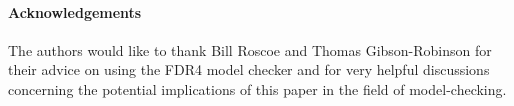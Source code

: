 
\paragraph{Acknowledgements}
The authors would like to thank Bill Roscoe and Thomas Gibson-Robinson for their advice on using the FDR4 model checker and for very helpful discussions concerning the potential implications of this paper in the field of model-checking.
